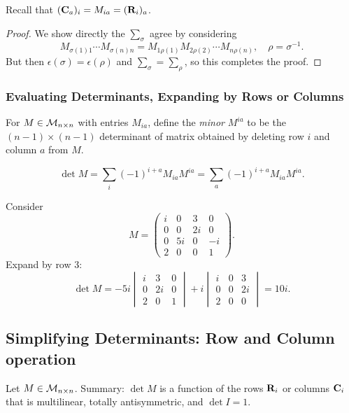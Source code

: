\documentclass[10pt]{article}
\begin{document}
    Recall that $ ({\bf C}_{a})_i=M_{ia}=({\bf R}_{i})_a $.
    \begin{proof}
        We show directly the $ \sum_\sigma $ agree by considering 
        \[
            M_{\sigma(1)1}\cdots M_{\sigma(n)n} = M_{1\rho(1)}M_{2\rho(2)}\cdots M_{n\rho(n)},\quad \rho=\sigma^{-1}.
        \]
        But then $ \epsilon(\sigma)=\epsilon(\rho) $ and $ \sum_\sigma=\sum_\rho $, so this completes the proof.
    \end{proof}
    \subsubsection{Evaluating Determinants, Expanding by Rows or Columns}
    \begin{definition}
        For $ M\in {\mathcal{M}}_{n\times n} $ with entries $M_{ia}$, define the \textit{minor} $ M^{ia} $ to be the $ (n-1)\times (n-1) $ determinant of matrix obtained by deleting row $i$ and column $a$ from $M$.
    \end{definition}
    \begin{proposition}
        \[
            \det M = \sum_{i}(-1)^{i+a}M_{ia}M^{ia} = \sum_{a}(-1)^{i+a}M_{ia}M^{ia}
        .\]
    \end{proposition}
    \begin{example}
        Consider 
        \[
            M=\begin{pmatrix}
                i&0&3&0\\
                0&0&2i&0\\
                0&5i&0&-i\\
                2&0&0&1
            \end{pmatrix}
        .\]
        Expand by row 3:
        \[
            \det M=-5i\begin{vmatrix}
                i&3&0\\
                0&2i&0\\
                2&0&1
            \end{vmatrix}+i\begin{vmatrix}
                i&0&3\\
                0&0&2i\\
                2&0&0
            \end{vmatrix}
            = 10i.
        \]
    \end{example}
    \subsection{Simplifying Determinants: Row and Column operation}
    Let $ M\in {\mathcal{M}}_{n\times n} $. Summary: $ \det M $ is a function of the rows $ {\bf R}_i $ or columns $ {\bf C}_i $ that is multilinear, totally antisymmetric, and $ \det I = 1 $.
\end{document}
